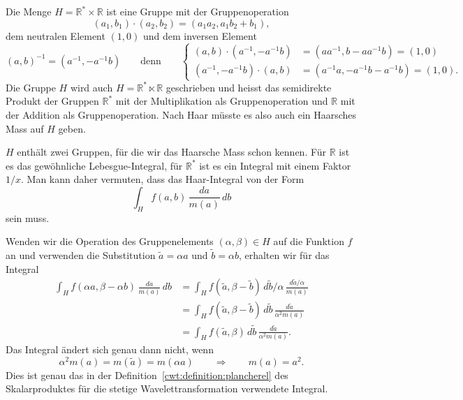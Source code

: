 Die Menge $H=\mathbb R^*\times \mathbb R$ ist eine Gruppe mit der
Gruppenoperation
\[
(a_1,b_1)\cdot (a_2,b_2) = (a_1a_2,a_1b_2+b_1),
\]
dem neutralen Element $(1,0)$ und dem inversen Element
\[
(a,b)^{-1} = (a^{-1}, -a^{-1}b)
\qquad\text{denn}\qquad
\left\{
\begin{aligned}
(a,b)\cdot (a^{-1},-a^{-1}b)
&=
(aa^{-1},b-aa^{-1}b)=(1,0)
\\
(a^{-1},-a^{-1}b)\cdot (a,b)
&=
(a^{-1}a,-a^{-1}b-a^{-1}b)=(1,0).
\end{aligned}
\right.
\]
Die Gruppe $H$ wird auch $H=\mathbb R^*\ltimes \mathbb R$ geschrieben
und heisst das semidirekte Produkt der Gruppen $\mathbb R^*$ mit der
Multiplikation als Gruppenoperation und $\mathbb R$ mit der Addition
als Gruppenoperation.
Nach Haar müsste es also auch ein Haarsches Mass auf $H$ geben.

$H$ enthält zwei Gruppen, für die wir das Haarsche Mass schon kennen.
Für $\mathbb R$ ist es das gewöhnliche Lebesgue-Integral, für $\mathbb R^*$
ist es ein Integral mit einem Faktor $1/x$.
Man kann daher vermuten, dass das Haar-Integral von der Form
\[
\int_H f(a,b) \,\frac{da}{m(a)}\,db
\]
sein muss.

Wenden wir die Operation des Gruppenelements $(\alpha,\beta)\in H$
auf die Funktion $f$ an und verwenden die Substitution
$\tilde{a}=\alpha a$ und $\tilde{b}=\alpha b$, erhalten wir für das
Integral
\begin{align*}
\int_H f(\alpha a,\beta-\alpha b) \,\frac{da}{m(a)}\,db
&=
\int_H f(\tilde{a}, \beta - \tilde b) \,
d\tilde{b}/\alpha\,\frac{d\tilde{a}/\alpha}{m(a)}
\\
&=
\int_H f(\tilde{a}, \beta - \tilde b) \,
d\tilde{b}\,\frac{d\tilde{a}}{\alpha^2m(a)}
\\
&=
\int_H f(\tilde{a}, \beta) \,
d\tilde{b}\,\frac{d\tilde{a}}{\alpha^2m(a)}.
\end{align*}
Das Integral ändert sich genau dann nicht, wenn
\[
\alpha^2 m(a)
=
m(\tilde{a})
=
m(\alpha a)
\qquad\Rightarrow\qquad
m(a) = a^2.
\]
Dies ist genau das in der Definition~\ref{cwt:definition:plancherel}
des Skalarproduktes für die stetige Wavelettransformation verwendete
Integral.





